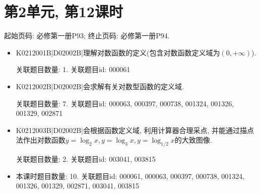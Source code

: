 \section*{第2单元, 第12课时}
起始页码: 必修第一册P93; 终止页码: 必修第一册P94.
\begin{itemize}
\item K0212001B|D02002B|理解对数函数的定义(包含对数函数定义域为$(0,+\infty)$).

关联题目数量: 1. 关联题目id: 000061

\item K0212002B|D02002B|会求解有关对数型函数的定义域.

关联题目数量: 7. 关联题目id: 000063, 000397, 000738, 001324, 001326, 001329, 002871

\item K0212003B|D02002B|会根据函数定义域, 利用计算器合理采点, 并能通过描点法作出对数函数$y=\log_2x,y=\log_3x,y=\log_{1/2}x$的大致图像.

关联题目数量: 2. 关联题目id: 003041, 003815

\item 本课时题目数量: 10. 关联题目id: 000061, 000063, 000397, 000738, 001324, 001326, 001329, 002871, 003041, 003815

\end{itemize}

